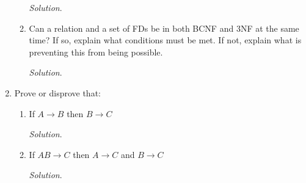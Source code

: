 \documentclass[10pt]{article}
\begin{document}
\begin{enumerate}
\begin{enumerate}
              \begin{mdframed}[leftmargin=-6.5mm]
              \textit{Solution}.\\
              \end{mdframed}
              
        \item Can a relation and a set of FDs be in both BCNF and 3NF at the same time? If so,            explain what conditions must be met. If not, explain what is preventing this from           being possible.
        
              \begin{mdframed}[leftmargin=-6.5mm]
              \textit{Solution}.\\
              \end{mdframed}
              
    \end{enumerate}
    
    \item Prove or disprove that:
    \begin{enumerate}
        \item If $A \rightarrow B$ then $B \rightarrow C$
        
        \begin{mdframed}[leftmargin=-6.5mm]
        \textit{Solution}.\\
        \end{mdframed}
        
        \item If $AB \rightarrow C$ then $A \rightarrow C$ and $B \rightarrow C$
        
        \begin{mdframed}[leftmargin=-6.5mm]
        \textit{Solution}.\\
        \end{mdframed}
        
    \end{enumerate}
    

\end{enumerate}
\end{document}
